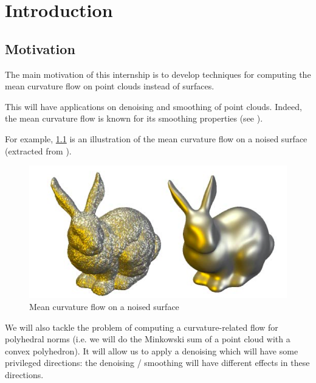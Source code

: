


\chapter{Introduction}


\section{Motivation}

The main motivation of this internship is to develop techniques for computing the
mean curvature flow on point clouds instead of surfaces.

This will have applications on denoising and smoothing of point clouds. Indeed,
the mean curvature flow is known for its smoothing properties (see
\cite{ciomaga2010level}).

For example, \ref{fig:mean-curvature-flow-ex} is an illustration of the mean
curvature flow on a noised surface (extracted from
\cite{clarenz2000anisotropic}).

\begin{figure}[h]
    \centering
    \includegraphics[scale=0.3]{img/mean-curvature-flow-rabbit}
    \caption{Mean curvature flow on a noised surface}
    \label{fig:mean-curvature-flow-ex}
\end{figure}

We will also tackle the problem of computing a curvature-related flow for
polyhedral norms (i.e. we will do the Minkowski sum of a point cloud with a
convex polyhedron). It will allow us to apply a denoising which will have some
privileged directions: the denoising / smoothing will have different effects in
these directions.

